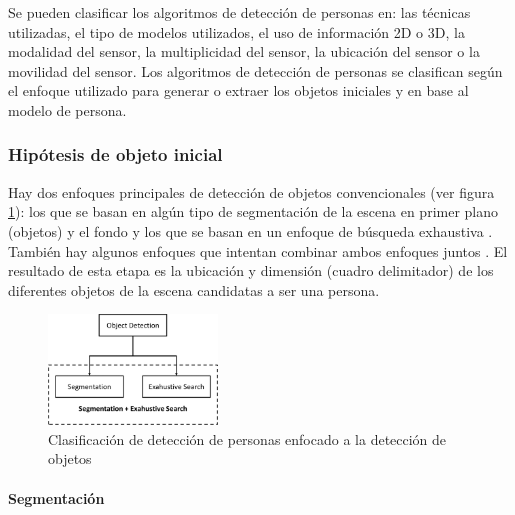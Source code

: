 Se pueden clasificar los algoritmos de detección de personas en: las técnicas utilizadas, el tipo de modelos utilizados, el uso de información 2D o 3D, la modalidad del sensor, la multiplicidad del sensor, la ubicación del sensor o la movilidad del sensor. Los algoritmos de detección de personas se clasifican según el enfoque utilizado para generar o extraer los objetos iniciales y en base al modelo de persona.

\subsubsection*{Hipótesis de objeto inicial}
\label{subsubsec:hipotesis-inicial-deteccion-personas-objetos}

Hay dos enfoques principales de detección de objetos convencionales (ver figura \ref{fig:people-detection-classification}): los que se basan en algún tipo de segmentación de la escena en primer plano (objetos) y el fondo \cite{868681} y los que se basan en un enfoque de búsqueda exhaustiva \cite{4408936}. También hay algunos enfoques que intentan combinar ambos enfoques juntos \cite{4220664}. El resultado de esta etapa es la ubicación y dimensión (cuadro delimitador) de los diferentes objetos de la escena candidatas a ser una persona.

\begin{figure}[ht]
\centering
\includegraphics[width=0.4\textwidth]{img/chapters/estado-del-arte/people-detection-classification.png}
\caption{\label{fig:people-detection-classification}Clasificación de detección de personas enfocado a la detección de objetos \cite{https://doi.org/10.1049/iet-cvi.2014.0148}}
\end{figure}

\paragraph*{Segmentación}\mbox{} \\
\label{parag:deteccion-objetos-personas-segmentacion}

